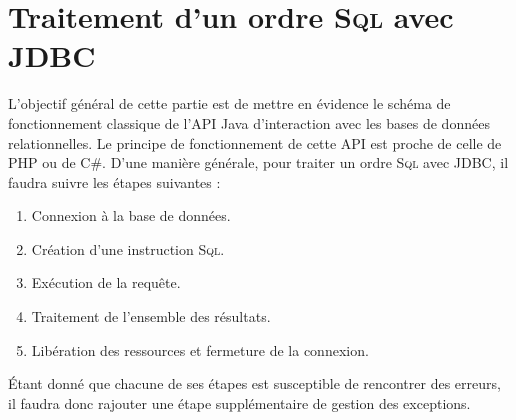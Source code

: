 \documentclass[a4paper,11pt]{article}
\newenvironment{agrandirmarges}[2]{%
\begin{list}{}{%
\setlength{\topsep}{0pt}%
\setlength{\listparindent}{\parindent}%
\setlength{\itemindent}{\parindent}%
\setlength{\parsep}{0pt plus 1pt}%
\checkoddpage%
\ifoddpage
\setlength{\leftmargin}{-#1}\setlength{\rightmargin}{-#2}
\else
\setlength{\leftmargin}{-#2}\setlength{\rightmargin}{-#1}
\fi}\item }%
{\end{list}}
\begin{document}
\begin{figure}
\begin{agrandirmarges}{1cm}{1cm}
    \hfill%
    \caption{}
  \end{agrandirmarges}
\end{figure}

\section{Traitement d'un ordre \textsc{Sql} avec JDBC}
L'objectif général de cette partie est de mettre en évidence le schéma de fonctionnement 
classique de l'API Java d'interaction avec les bases de données relationnelles. 
Le principe de fonctionnement de cette API est proche de celle de PHP ou de C\#.
D'une manière générale, pour traiter un ordre \textsc{Sql} avec JDBC, il faudra suivre les 
étapes suivantes :
\begin{enumerate}
  \item Connexion à la base de données.
  \item Création d'une instruction \textsc{Sql}.
  \item Exécution de la requête.
  \item Traitement de l'ensemble des résultats.
  \item Libération des ressources et fermeture de la connexion.
\end{enumerate}
Étant donné que chacune de ses étapes est susceptible de rencontrer des erreurs, il faudra donc rajouter une
étape supplémentaire de gestion des exceptions. 
\end{document}
